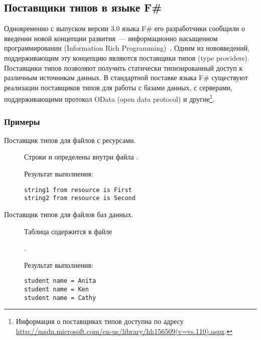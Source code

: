\subsection{Поставщики типов в языке F\#}\label{f-sharp-type-providers}
Одновременно с выпуском версии 3.0 языка F\# его разработчики сообщили о введении новой концепции развития~--- информационно насыщенном программировании (Information Rich Programming)~\cite{joepamer2011}.
Одним из нововведений, поддерживающим эту концепцию являются поставщики типов (type providers).
Поставщики типов позволяют получить статически типизированный доступ к различным источникам данных.
В стандартной поставке языка F\# существуют реализации поставщиков типов для работы с базами данных, с серверами, поддерживающими протокол OData (open data protocol) и другие\footnote{Информация о поставщиках типов доступна по адресу \url{http://msdn.microsoft.com/en-us/library/hh156509(v=vs.110).aspx}.}.

\subsubsection{Примеры}
\begin{description}
\item[Поставщик типов для файлов с ресурсами.] Строки  и  определены внутри файла .


Результат выполнения:
\begin{code}\begin{lstlisting}
string1 from resource is First
string2 from resource is Second
\end{lstlisting}\end{code}

\item[Поставщик типов для файлов баз данных.] Таблица  содержится в файле

.


Результат выполнения:
\begin{code}\begin{lstlisting}
student name = Anita
student name = Ken
student name = Cathy
\end{lstlisting}\end{code}

\end{description}